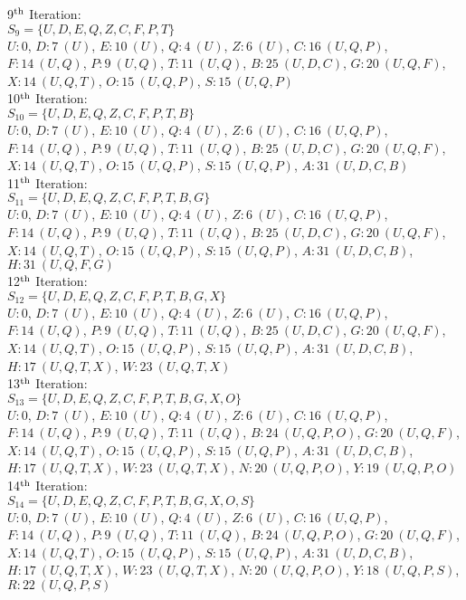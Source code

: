 9$\rm^{th}$ Iteration:\\
$S_{9}=\lbrace U,D,E,Q,Z,C,F,P,T \rbrace$\\
$U:0$, $D:7\ (U)$, $E:10\ (U)$, $Q:4\ (U)$, $Z:6\ (U)$, $C:16\ (U,Q,P)$, $F:14\ (U,Q)$, $P:9\ (U,Q)$, $T:11\ (U,Q)$, $B:25\ (U,D,C)$, $G:20\ (U,Q,F)$, $X:14\ (U,Q,T)$, $O:15\ (U,Q,P)$, $S:15\ (U,Q,P)$\\

10$\rm^{th}$ Iteration:\\
$S_{10}=\lbrace U,D,E,Q,Z,C,F,P,T,B \rbrace$\\
$U:0$, $D:7\ (U)$, $E:10\ (U)$, $Q:4\ (U)$, $Z:6\ (U)$, $C:16\ (U,Q,P)$, $F:14\ (U,Q)$, $P:9\ (U,Q)$, $T:11\ (U,Q)$, $B:25\ (U,D,C)$, $G:20\ (U,Q,F)$, $X:14\ (U,Q,T)$, $O:15\ (U,Q,P)$, $S:15\ (U,Q,P)$, $A:31\ (U,D,C,B)$\\

11$\rm^{th}$ Iteration:\\
$S_{11}=\lbrace U,D,E,Q,Z,C,F,P,T,B,G \rbrace$\\
$U:0$, $D:7\ (U)$, $E:10\ (U)$, $Q:4\ (U)$, $Z:6\ (U)$, $C:16\ (U,Q,P)$, $F:14\ (U,Q)$, $P:9\ (U,Q)$, $T:11\ (U,Q)$, $B:25\ (U,D,C)$, $G:20\ (U,Q,F)$, $X:14\ (U,Q,T)$, $O:15\ (U,Q,P)$, $S:15\ (U,Q,P)$, $A:31\ (U,D,C,B)$, $H:31\ (U,Q,F,G)$\\

12$\rm^{th}$ Iteration:\\
$S_{12}=\lbrace U,D,E,Q,Z,C,F,P,T,B,G,X \rbrace$\\
$U:0$, $D:7\ (U)$, $E:10\ (U)$, $Q:4\ (U)$, $Z:6\ (U)$, $C:16\ (U,Q,P)$, $F:14\ (U,Q)$, $P:9\ (U,Q)$, $T:11\ (U,Q)$, $B:25\ (U,D,C)$, $G:20\ (U,Q,F)$, $X:14\ (U,Q,T)$, $O:15\ (U,Q,P)$, $S:15\ (U,Q,P)$, $A:31\ (U,D,C,B)$, $H:17\ (U,Q,T,X)$, $W:23\ (U,Q,T,X)$\\

13$\rm^{th}$ Iteration:\\
$S_{13}=\lbrace U,D,E,Q,Z,C,F,P,T,B,G,X,O \rbrace$\\
$U:0$, $D:7\ (U)$, $E:10\ (U)$, $Q:4\ (U)$, $Z:6\ (U)$, $C:16\ (U,Q,P)$, $F:14\ (U,Q)$, $P:9\ (U,Q)$, $T:11\ (U,Q)$, $B:24\ (U,Q,P,O)$, $G:20\ (U,Q,F)$, $X:14\ (U,Q,T)$, $O:15\ (U,Q,P)$, $S:15\ (U,Q,P)$, $A:31\ (U,D,C,B)$, $H:17\ (U,Q,T,X)$, $W:23\ (U,Q,T,X)$, $N:20\ (U,Q,P,O)$, $Y:19\ (U,Q,P,O)$\\

14$\rm^{th}$ Iteration:\\
$S_{14}=\lbrace U,D,E,Q,Z,C,F,P,T,B,G,X,O,S \rbrace$\\
$U:0$, $D:7\ (U)$, $E:10\ (U)$, $Q:4\ (U)$, $Z:6\ (U)$, $C:16\ (U,Q,P)$, $F:14\ (U,Q)$, $P:9\ (U,Q)$, $T:11\ (U,Q)$, $B:24\ (U,Q,P,O)$, $G:20\ (U,Q,F)$, $X:14\ (U,Q,T)$, $O:15\ (U,Q,P)$, $S:15\ (U,Q,P)$, $A:31\ (U,D,C,B)$, $H:17\ (U,Q,T,X)$, $W:23\ (U,Q,T,X)$, $N:20\ (U,Q,P,O)$, $Y:18\ (U,Q,P,S)$, $R:22\ (U,Q,P,S)$\\

